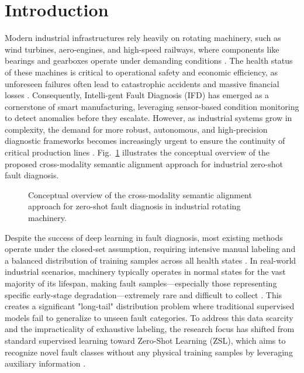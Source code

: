 \documentclass[journal]{IEEEtran}
\begin{document}
\section{Introduction}
Modern industrial infrastructures rely heavily on rotating machinery, such as wind turbines, aero-engines, and high-speed railways, where components like bearings and gearboxes operate under demanding conditions \cite{zhai2021multi}. The health status of these machines is critical to operational safety and economic efficiency, as unforeseen failures often lead to catastrophic accidents and massive financial losses \cite{lei2020applications}. Consequently, Intelli-gent Fault Diagnosis (IFD) has emerged as a cornerstone of smart manufacturing, leveraging sensor-based condition monitoring to detect anomalies before they escalate. However, as industrial systems grow in complexity, the demand for more robust, autonomous, and high-precision diagnostic frameworks becomes increasingly urgent to ensure the continuity of critical production lines \cite{li2020deep}. Fig.~\ref{fig:concept} illustrates the conceptual overview of the proposed cross-modality semantic alignment approach for industrial zero-shot fault diagnosis.

\begin{figure}[!t]
\centering
{}
\caption{Conceptual overview of the cross-modality semantic alignment approach for zero-shot fault diagnosis in industrial rotating machinery.}
\label{fig:concept}
\end{figure}

Despite the success of deep learning in fault diagnosis, most existing methods operate under the closed-set assumption, requiring intensive manual labeling and a balanced distribution of training samples across all health states \cite{zhang2022digital}. In real-world industrial scenarios, machinery typically operates in normal states for the vast majority of its lifespan, making fault samples—especially those representing specific early-stage degradation—extremely rare and difficult to collect \cite{liu2018zero}. This creates a significant "long-tail" distribution problem where traditional supervised models fail to generalize to unseen fault categories. To address this data scarcity and the impracticality of exhaustive labeling, the research focus has shifted from standard supervised learning toward Zero-Shot Learning (ZSL), which aims to recognize novel fault classes without any physical training samples by leveraging auxiliary information \cite{wang2019zero, socher2013zero}.
\end{document}
